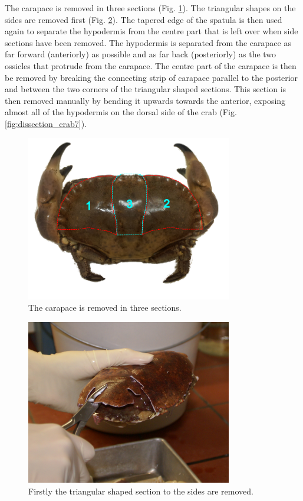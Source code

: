 The carapace is removed in three sections (Fig. \ref{fig:dissection_crab_sections}). The triangular shapes on the sides are removed first (Fig. \ref{fig:dissection_crab5}). The tapered edge of the spatula is then used again to separate the hypodermis from the centre part that is left over when side sections have been removed. %
The hypodermis is separated from the carapace as far forward (anteriorly) as possible and as far back (posteriorly) as the two ossicles that protrude from the carapace. The centre part of the carapace is then be removed by breaking the connecting strip  of carapace parallel to the posterior and between the two  corners of the triangular shaped sections. This section is then removed manually by bending it upwards towards the anterior, exposing almost all of the hypodermis on the dorsal side of the crab (Fig. \ref{fig:dissection_crab7}).

\begin{figure}[H]
	\begin{center}
		\includegraphics[width=9cm]{graphics/dissection_crab_sections.png}
		\caption{The carapace is removed in three sections.}
		\label{fig:dissection_crab_sections}
	\end{center}
\end{figure}
\begin{figure}[H]
	\begin{center}
		\includegraphics[width=9cm]{graphics/dissection_crab5.png}
		\caption{Firstly the triangular shaped section to the sides are removed.}
		\label{fig:dissection_crab5}
	\end{center}
\end{figure}

